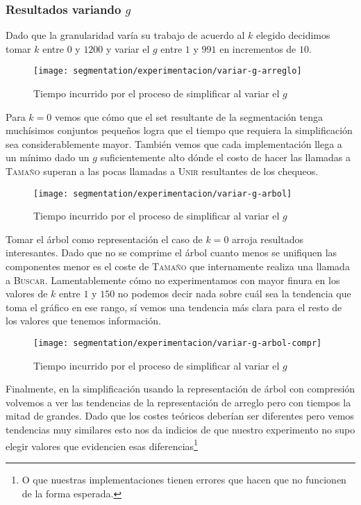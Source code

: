 \subsubsection{Resultados variando $g$}

Dado que la granularidad varía su trabajo de acuerdo al $k$ elegido decidimos
tomar $k$ entre $0$ y $1200$ y variar el $g$ entre $1$ y $991$ en incrementos
de $10$.

\begin{figure}[h]
	\centering
	\texttt{[image: segmentation/experimentacion/variar-g-arreglo]}
	\caption{Tiempo incurrido por el proceso de simplificar al variar el $g$}
\end{figure}

Para $k=0$ vemos que cómo que el set resultante de la segmentación tenga
muchísimos conjuntos pequeños logra que el tiempo que requiera la
simplificación sea considerablemente mayor. También vemos que cada
implementación llega a un mínimo dado un $g$ suficientemente alto dónde el
costo de hacer las llamadas a \textsc{Tamaño} superan a las pocas llamadas a
\textsc{Unir} resultantes de los chequeos.

\begin{figure}[h]
	\centering
	\texttt{[image: segmentation/experimentacion/variar-g-arbol]}
	\caption{Tiempo incurrido por el proceso de simplificar al variar el $g$}
\end{figure}

Tomar el árbol como representación el caso de $k=0$ arroja resultados
interesantes. Dado que no se comprime el árbol cuanto menos se unifiquen las
componentes menor es el coste de \textsc{Tamaño} que internamente realiza una
llamada a \textsc{Buscar}. Lamentablemente cómo no experimentamos con mayor
finura en los valores de $k$ entre $1$ y $150$ no podemos decir nada sobre cuál
sea la tendencia que toma el gráfico en ese rango, sí vemos una tendencia más
clara para el resto de los valores que tenemos información.

\begin{figure}[h]
	\centering
	\texttt{[image: segmentation/experimentacion/variar-g-arbol-compr]}
	\caption{Tiempo incurrido por el proceso de simplificar al variar el $g$}
\end{figure}

Finalmente, en la simplificación usando la representación de árbol con
compresión volvemos a ver las tendencias de la representación de arreglo pero
con tiempos la mitad de grandes. Dado que los costes teóricos deberían ser
diferentes pero vemos tendencias muy similares esto nos da indicios de que
nuestro experimento no supo elegir valores que evidencien esas
diferencias\footnote{O que nuestras implementaciones tienen errores que hacen
que no funcionen de la forma esperada.}
